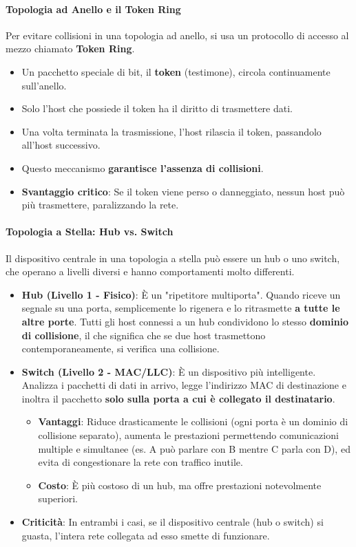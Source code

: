 \paragraph{Topologia ad Anello e il Token Ring}
Per evitare collisioni in una topologia ad anello, si usa un protocollo di accesso al mezzo chiamato \textbf{Token Ring}.
\begin{itemize}
    \item Un pacchetto speciale di bit, il \textbf{token} (testimone), circola continuamente sull'anello.
    \item Solo l'host che possiede il token ha il diritto di trasmettere dati.
    \item Una volta terminata la trasmissione, l'host rilascia il token, passandolo all'host successivo.
    \item Questo meccanismo \textbf{garantisce l'assenza di collisioni}.
    \item \textbf{Svantaggio critico}: Se il token viene perso o danneggiato, nessun host può più trasmettere, paralizzando la rete.
\end{itemize}

\paragraph{Topologia a Stella: Hub vs. Switch}
Il dispositivo centrale in una topologia a stella può essere un hub o uno switch, che operano a livelli diversi e hanno comportamenti molto differenti.
\begin{itemize}
    \item \textbf{Hub (Livello 1 - Fisico)}: È un "ripetitore multiporta". Quando riceve un segnale su una porta, semplicemente lo rigenera e lo ritrasmette \textbf{a tutte le altre porte}. Tutti gli host connessi a un hub condividono lo stesso \textbf{dominio di collisione}, il che significa che se due host trasmettono contemporaneamente, si verifica una collisione.
    \item \textbf{Switch (Livello 2 - MAC/LLC)}: È un dispositivo più intelligente. Analizza i pacchetti di dati in arrivo, legge l'indirizzo MAC di destinazione e inoltra il pacchetto \textbf{solo sulla porta a cui è collegato il destinatario}.
    \begin{itemize}
        \item \textbf{Vantaggi}: Riduce drasticamente le collisioni (ogni porta è un dominio di collisione separato), aumenta le prestazioni permettendo comunicazioni multiple e simultanee (es. A può parlare con B mentre C parla con D), ed evita di congestionare la rete con traffico inutile.
        \item \textbf{Costo}: È più costoso di un hub, ma offre prestazioni notevolmente superiori.
    \end{itemize}
    \item \textbf{Criticità}: In entrambi i casi, se il dispositivo centrale (hub o switch) si guasta, l'intera rete collegata ad esso smette di funzionare.
\end{itemize}

